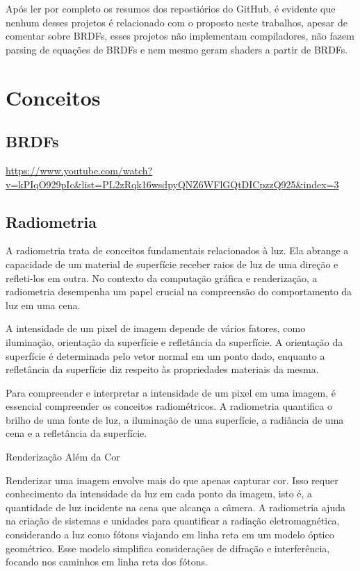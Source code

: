 \documentclass[english, 
               brazil, 
               bsc] %
               {dcomp-abntex2}
\begin{document}
Após ler por completo os resumos dos repostiórios do GitHub, é evidente que nenhum desses projetos é relacionado com o proposto neste trabalhos, apesar de comentar sobre BRDFs, esses projetos não implementam compiladores, não fazem parsing de equações de BRDFs e nem mesmo geram shaders a partir de BRDFs.


\chapter{Conceitos}

\section{BRDFs}

\url{https://www.youtube.com/watch?v=kPIqO929pIc&list=PL2zRqk16wsdpyQNZ6WFlGQtDICpzzQ925&index=3}

\section{Radiometria}

A radiometria trata de conceitos fundamentais relacionados à luz. Ela abrange a capacidade de um material de superfície receber raios de luz de uma direção e refleti-los em outra. No contexto da computação gráfica e renderização, a radiometria desempenha um papel crucial na compreensão do comportamento da luz em uma cena.

A intensidade de um pixel de imagem depende de vários fatores, como iluminação, orientação da superfície e refletância da superfície. A orientação da superfície é determinada pelo vetor normal em um ponto dado, enquanto a refletância da superfície diz respeito às propriedades materiais da mesma.

Para compreender e interpretar a intensidade de um pixel em uma imagem, é essencial compreender os conceitos radiométricos. A radiometria quantifica o brilho de uma fonte de luz, a iluminação de uma superfície, a radiância de uma cena e a refletância da superfície.

Renderização Além da Cor

Renderizar uma imagem envolve mais do que apenas capturar cor. Isso requer conhecimento da intensidade da luz em cada ponto da imagem, isto é, a quantidade de luz incidente na cena que alcança a câmera. A radiometria ajuda na criação de sistemas e unidades para quantificar a radiação eletromagnética, considerando a luz como fótons viajando em linha reta em um modelo óptico geométrico. Esse modelo simplifica considerações de difração e interferência, focando nos caminhos em linha reta dos fótons.
\end{document}
